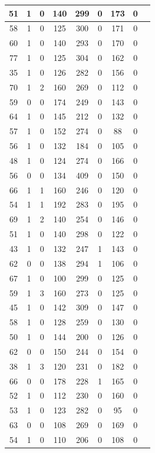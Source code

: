 \documentclass{article}
\begin{document}
\begin{longtable}{
|
c|c|c|c|c|c|c|c|c|}
\hline
51 & 1 & 0 & 140 & 299 & 0 & 173 & 0 \\
\hline
58 & 1 & 0 & 125 & 300 & 0 & 171 & 0 \\
\hline
60 & 1 & 0 & 140 & 293 & 0 & 170 & 0 \\
\hline
77 & 1 & 0 & 125 & 304 & 0 & 162 & 0 \\
\hline
35 & 1 & 0 & 126 & 282 & 0 & 156 & 0 \\
\hline
70 & 1 & 2 & 160 & 269 & 0 & 112 & 0 \\
\hline
59 & 0 & 0 & 174 & 249 & 0 & 143 & 0 \\
\hline
64 & 1 & 0 & 145 & 212 & 0 & 132 & 0 \\
\hline
57 & 1 & 0 & 152 & 274 & 0 & 88 & 0 \\
\hline
56 & 1 & 0 & 132 & 184 & 0 & 105 & 0 \\
\hline
48 & 1 & 0 & 124 & 274 & 0 & 166 & 0 \\
\hline
56 & 0 & 0 & 134 & 409 & 0 & 150 & 0 \\
\hline
66 & 1 & 1 & 160 & 246 & 0 & 120 & 0 \\
\hline
54 & 1 & 1 & 192 & 283 & 0 & 195 & 0 \\
\hline
69 & 1 & 2 & 140 & 254 & 0 & 146 & 0 \\
\hline
51 & 1 & 0 & 140 & 298 & 0 & 122 & 0 \\
\hline
43 & 1 & 0 & 132 & 247 & 1 & 143 & 0 \\
\hline
62 & 0 & 0 & 138 & 294 & 1 & 106 & 0 \\
\hline
67 & 1 & 0 & 100 & 299 & 0 & 125 & 0 \\
\hline
59 & 1 & 3 & 160 & 273 & 0 & 125 & 0 \\
\hline
45 & 1 & 0 & 142 & 309 & 0 & 147 & 0 \\
\hline
58 & 1 & 0 & 128 & 259 & 0 & 130 & 0 \\
\hline
50 & 1 & 0 & 144 & 200 & 0 & 126 & 0 \\
\hline
62 & 0 & 0 & 150 & 244 & 0 & 154 & 0 \\
\hline
38 & 1 & 3 & 120 & 231 & 0 & 182 & 0 \\
\hline
66 & 0 & 0 & 178 & 228 & 1 & 165 & 0 \\
\hline
52 & 1 & 0 & 112 & 230 & 0 & 160 & 0 \\
\hline
53 & 1 & 0 & 123 & 282 & 0 & 95 & 0 \\
\hline
63 & 0 & 0 & 108 & 269 & 0 & 169 & 0 \\
\hline
54 & 1 & 0 & 110 & 206 & 0 & 108 & 0 \\

\end{longtable}
\end{document}
